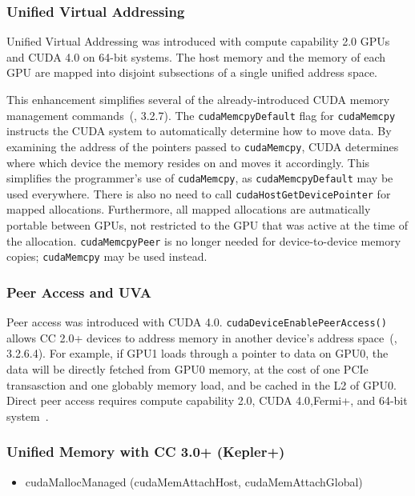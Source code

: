 \subsubsection{Unified Virtual Addressing}
\label{sec:uva}

Unified Virtual Addressing was introduced with compute capability 2.0 GPUs and CUDA 4.0 on 64-bit systems.
The host memory and the memory of each GPU are mapped into disjoint subsections of a single unified address space.

This enhancement simplifies several of the already-introduced CUDA memory management commands~(\cite{nvidia2011cudac40}, 3.2.7).
The \texttt{cudaMemcpyDefault} flag for \texttt{cudaMemcpy} instructs the CUDA system to automatically determine how to move data.
By examining the address of the pointers passed to \texttt{cudaMemcpy}, CUDA determines where which device the memory resides on and moves it accordingly.
This simplifies the programmer's use of \texttt{cudaMemcpy}, as \texttt{cudaMemcpyDefault} may be used everywhere.
There is also no need to call \texttt{cudaHostGetDevicePointer} for mapped allocations.
Furthermore, all mapped allocations are autmatically portable between GPUs, not restricted to the GPU that was active at the time of the allocation.
\texttt{cudaMemcpyPeer} is no longer needed for device-to-device memory copies; \texttt{cudaMemcpy} may be used instead.

\subsubsection{Peer Access and UVA}

Peer access was introduced with CUDA 4.0.
\texttt{cudaDeviceEnablePeerAccess()} allows CC 2.0+ devices to address memory in another device's address space~(\cite{nvidia2011cudac40}, 3.2.6.4).
For example, if GPU1 loads through a pointer to data on GPU0, the data will be directly fetched from GPU0 memory, at the cost of one PCIe transasction and one globably memory load, and be cached in the L2 of GPU0.
Direct peer access requires compute capability 2.0, CUDA 4.0,Fermi+, and 64-bit system~\cite{schroeder2011peer}.

\subsubsection{Unified Memory with CC 3.0+ (Kepler+)}

\begin{itemize}
	\item cudaMallocManaged (cudaMemAttachHost, cudaMemAttachGlobal)
\end{itemize}


